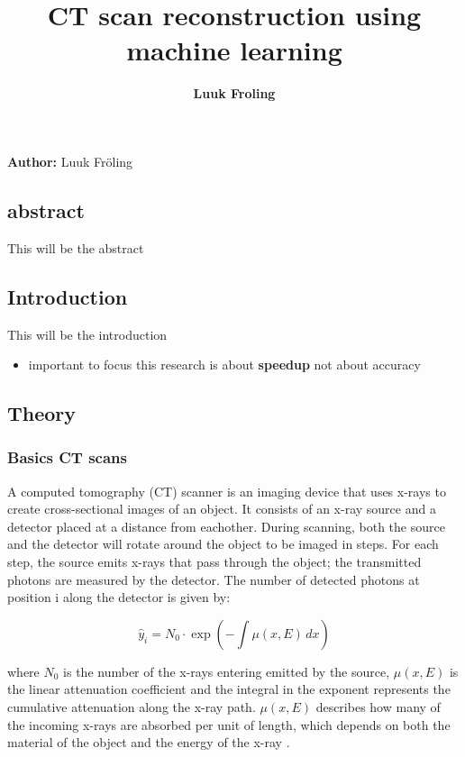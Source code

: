 \documentclass{article}
\title{CT scan reconstruction using machine learning}
\date{\displaydate{articleDate}}
\author{\bfseries Luuk Froling\mdseries\\}
\begin{document}
\maketitle
{}

\textbf{Author:} Luuk Fröling

\subsection{abstract}

This will be the abstract

\subsection{Introduction}

This will be the introduction

\begin{itemize}
\item important to focus this research is about \textbf{speedup} not about accuracy
\end{itemize}

\subsection{Theory}

\subsubsection{Basics CT scans}

A computed tomography (CT) scanner is an imaging device that uses x-rays to create cross-sectional images of an object. It consists of an x-ray source and a detector placed at a distance from eachother. During scanning, both the source and the detector will rotate around the object to be imaged in steps. For each step, the source emits x-rays that pass through the object; the transmitted photons are measured by the detector. The number of detected photons at position i along the detector is given by:

\begin{equation}
\label{first }
\hat{y}_i  = N_0 \cdot \exp\left(-\int \mu(x, E) \, dx\right)
\end{equation}

where $N_0$ is the number of the x-rays entering emitted by the source, $\mu(x, E)$ is the linear attenuation coefficient and the integral in the exponent represents the cumulative attenuation along the x-ray path. $\mu(x, E)$ describes how many of the incoming x-rays are absorbed per unit of length, which depends on both the material of the object and the energy of the x-ray \citep{kamalian2016ct_principles}.
\end{document}
